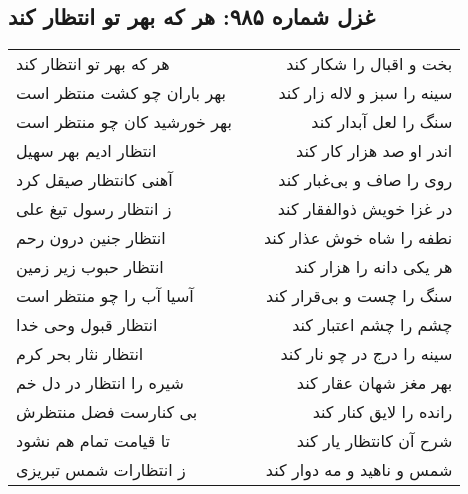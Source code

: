 \begin{center}
\section*{غزل شماره ۹۸۵: هر که بهر تو انتظار کند}
\label{sec:0985}
\begin{longtable}{l p{0.5cm} r}
هر که بهر تو انتظار کند
&&
بخت و اقبال را شکار کند
\\
بهر باران چو کشت منتظر است
&&
سینه را سبز و لاله زار کند
\\
بهر خورشید کان چو منتظر است
&&
سنگ را لعل آبدار کند
\\
انتظار ادیم بهر سهیل
&&
اندر او صد هزار کار کند
\\
آهنی کانتظار صیقل کرد
&&
روی را صاف و بی‌غبار کند
\\
ز انتظار رسول تیغ علی
&&
در غزا خویش ذوالفقار کند
\\
انتظار جنین درون رحم
&&
نطفه را شاه خوش عذار کند
\\
انتظار حبوب زیر زمین
&&
هر یکی دانه را هزار کند
\\
آسیا آب را چو منتظر است
&&
سنگ را چست و بی‌قرار کند
\\
انتظار قبول وحی خدا
&&
چشم را چشم اعتبار کند
\\
انتظار نثار بحر کرم
&&
سینه را درج در چو نار کند
\\
شیره را انتظار در دل خم
&&
بهر مغز شهان عقار کند
\\
بی کنارست فضل منتظرش
&&
رانده را لایق کنار کند
\\
تا قیامت تمام هم نشود
&&
شرح آن کانتظار یار کند
\\
ز انتظارات شمس تبریزی
&&
شمس و ناهید و مه دوار کند
\\
\end{longtable}
\end{center}
